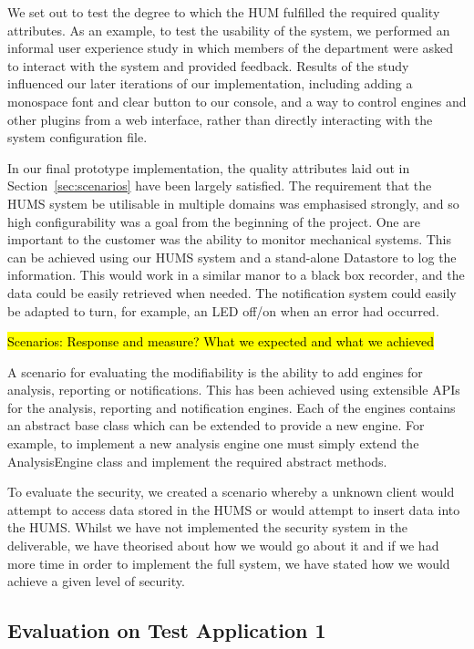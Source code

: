 \documentclass[10pt,a4paper]{article}
\begin{document}
We set out to test the degree to which the HUM fulfilled the required quality attributes. As an example, to test the usability of the system, we performed an informal user experience study in which members of the department were asked to interact with the system and provided feedback. Results of the study influenced our later iterations of our implementation, including adding a monospace font and clear button to our console, and a way to control engines and other plugins from a web interface, rather than directly interacting with the system configuration file.

In our final prototype implementation, the quality attributes laid out in Section~\ref{sec:scenarios} have been largely satisfied. The requirement that the HUMS system be utilisable in multiple domains was emphasised strongly, and so high configurability was a goal from the beginning of the project. One are important to the customer was the ability to monitor mechanical systems. This can be achieved using our HUMS system and a stand-alone Datastore to log the information. This would work in a similar manor to a black box recorder, and the data could be easily retrieved when needed. The notification system could easily be adapted to turn, for example, an LED off/on when an error had occurred.

\hl{Scenarios: Response and measure? What we expected and what we achieved}

A scenario for evaluating the modifiability is the ability to add engines for analysis, reporting or notifications. This has been achieved using extensible APIs for the analysis, reporting and notification engines. Each of the engines contains an abstract base class which can be extended to provide a new engine. For example, to implement a new analysis engine one must simply extend the AnalysisEngine class and implement the required abstract methods.

To evaluate the security, we created a scenario whereby a unknown client would attempt to access data stored in the HUMS or would attempt to insert data into the HUMS. Whilst we have not implemented the security system in the deliverable, we have theorised about how we would go about it and if we had more time in order to implement the full system, we have stated how we would achieve a given level of security.

\subsection{Evaluation on Test Application 1}
\label{sec:test_app1}
\end{document}
